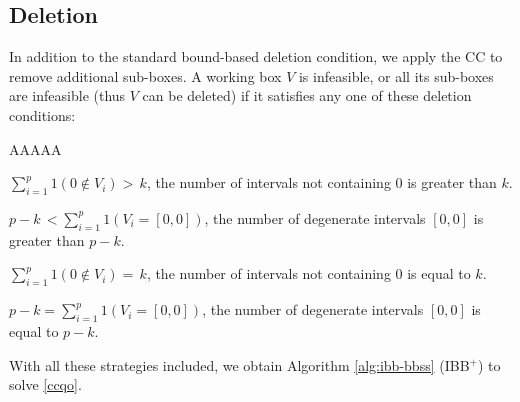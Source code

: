 \documentclass[10pt, letterpaper]{article}
\begin{document}
\subsection{Deletion} 
In addition to the standard bound-based deletion condition, we apply the CC to remove additional sub-boxes. A working box $V$ is infeasible, or all its sub-boxes are infeasible (thus $V$ can be deleted) if it satisfies any one of these deletion conditions:
\begin{labeling}{AAAAA}  %
    \item[($D1,V$)] \( \sum_{i=1}^{p} 1(0 \notin V_{i}) > \, k \), the number of intervals not containing $0$ is greater than $k$.
    \item[($D2,V$)] \( p-k \, < \sum_{i=1}^{p} 1(V_{i}=[0,0]) \), the number of degenerate intervals $[0, 0]$ is greater than $p-k$.
    \item[($D3,V$)] \( \sum_{i=1}^{p} 1(0 \notin V_{i}) = \, k \), the number of intervals not containing $0$ is equal to $k$.
    \item[($D4,V$)] \(  p - k = \sum_{i=1}^{p} 1(V_{i}=[0,0]) \), the number of degenerate intervals $[0, 0]$ is equal to $p-k$.    
\end{labeling}
With all these strategies included, we obtain Algorithm \ref{alg:ibb-bbss} (IBB$^{+}$) to solve \eqref{ccqo}.
\end{document}
